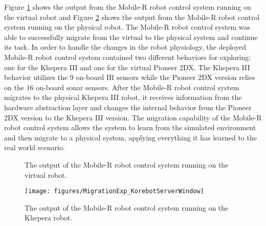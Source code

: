     Figure \ref{fig:validation2results-a} shows the output from the 
      Mobile-R robot control system running on the virtual robot and Figure 
      \ref{fig:validation2results-b} shows the output from the Mobile-R robot
      control system running on the physical robot.
    The Mobile-R robot control system was able to successfully migrate from the 
      virtual to the physical system and continue its task.
    In order to handle the changes in the robot physiology, the deployed
      Mobile-R robot control system contained two different behaviors for exploring: 
      one for the Khepera III and one for the virtual Pioneer 2DX.
    The Khepera III behavior utilizes the 9 on-board IR sensors while the
      Pioneer 2DX version relies on the 16 on-board sonar sensors.
    After the Mobile-R robot control system migrates to the physical Khepera III
      robot, it receives information from the hardware abstraction layer
      and changes the internal behavior from the Pioneer 2DX version to the 
      Khepera III version.
    The migration capability of the Mobile-R robot control system allows the 
      system to learn from the simulated environment and then migrate to a 
      physical system, applying everything it has learned to the real world 
      scenario.
    \begin{figure}%
      \begin{center}
      \end{center}
      \caption{The output of the Mobile-R robot control system running on the virtual 
               robot.}
      \label{fig:validation2results-a}
    \end{figure}
    \begin{figure}%
        \centerline{\texttt{[image: figures/MigrationExp\_KorebotServerWindow]}}
      \caption{The output of the Mobile-R robot control system running on the 
               Khepera robot.}
      \label{fig:validation2results-b}
    \end{figure}

